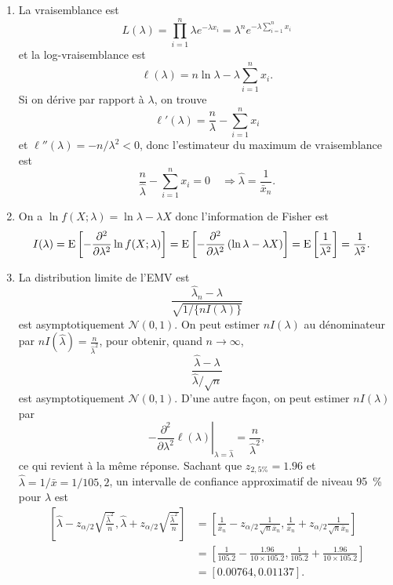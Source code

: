 \begin{solution}{5.12}
\begin{enumerate}
\item La vraisemblance est
$$
L(\lambda)=\prod_{i=1}^n \lambda e^{-\lambda x_i} = \lambda^n e^{-\lambda\sum_{i=1}^n x_i}
$$
et la log-vraisemblance est
$$
\ell(\lambda)=n\ln\lambda-\lambda\sum_{i=1}^n x_i.
$$
Si on dérive par rapport à $\lambda$, on trouve
$$
\ell'(\lambda)=\frac{n}{\lambda}-\sum_{i=1}^n x_i
$$
et $\ell''(\lambda)=-n/\lambda^2<0$, donc l'estimateur du maximum de vraisemblance est
$$
\frac{n}{\hat\lambda}-\sum_{i=1}^n x_i=0 \quad \Rightarrow \hat\lambda=\frac{1}{\bar x_n}.
$$

\item On a $\ln f(X;\lambda) = \ln\lambda-\lambda X$ donc l'information de Fisher est
\begin{align*}
I(\lambda)&=\operatorname{E}\left[-\frac{\partial^2}{\partial\lambda^2} \ln f(X;\lambda) \right]=\operatorname{E}\left[-\frac{\partial^2}{\partial\lambda^2} \left(\ln\lambda-\lambda X \right)\right]=\operatorname{E}\left[\frac{1}{\lambda^2} \right] =\frac{1}{\lambda^2}.
\end{align*}

\item La distribution limite de l'EMV est
$$
\frac{\hat\lambda_n-\lambda}{\sqrt{1/\{nI(\lambda)\}}}
$$
est asymptotiquement $\mathcal{N}(0,1)$. On peut estimer $nI(\lambda)$ au dénominateur par $nI(\hat\lambda)=\frac{n}{\hat\lambda^2}$, pour obtenir, quand $n\to\infty$,
$$
\frac{\hat\lambda-\lambda}{\hat\lambda/\sqrt{n}}
$$
est asymptotiquement $\mathcal{N}(0,1)$. D'une autre façon, on peut estimer $nI(\lambda)$ par
$$
-\left.\frac{\partial^2}{\partial\lambda^2} \ell(\lambda)\right|_{\lambda=\hat\lambda}=\frac{n}{\hat\lambda^2},
$$
ce qui revient à la même réponse. Sachant que $z_{2,5\%}=1.96$ et $\hat\lambda=1/\bar x=1/105,2$, un intervalle de confiance approximatif de niveau 95~\% pour $\lambda$ est
\begin{align*}
\left[\hat\lambda-z_{\alpha/2}\sqrt{\frac{\hat\lambda^2}{n}},\hat\lambda+z_{\alpha/2}\sqrt{\frac{\hat\lambda^2}{n}}\right]&=\left[\frac{1}{\bar x_n}-z_{\alpha/2}\frac{1}{\sqrt{n}\bar x_n}, \frac{1}{\bar x_n}+z_{\alpha/2}\frac{1}{\sqrt{n}\bar x_n}\right]\\
&=\left[\frac{1}{105.2}-\frac{1.96}{10\times105.2},\frac{1}{105.2}+\frac{1.96}{10\times105.2}\right]\\
&=\left[0.00764,0.01137\right].
\end{align*}


\end{enumerate}
\end{solution}
